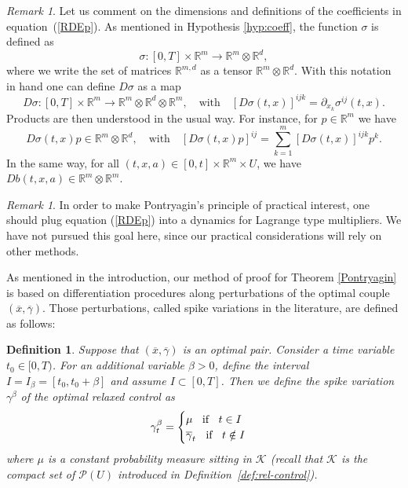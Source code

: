 \documentclass[12pt,reqno]{amsart}
\numberwithin{equation}{section}  %
\newcommand{\1}{{\bf 1}}
\newcommand{\2}{{\bf 2}}
\newcommand{\R}{\mathbb R}
\newcommand{\ck}{\mathcal K}
\newtheorem{definition}[theorem]{Definition}
\theoremstyle{remark}
\newtheorem{remark}[theorem]{Remark}
\theoremstyle{remark}
\begin{document}
        \begin{remark} Let us comment on the dimensions and definitions of the coefficients in equation~(\ref{RDEp}). As mentioned in Hypothesis \ref{hyp:coeff}, the function $\sigma$ is defined as 
        \[\sigma \colon [0,T]\times\R^{m}\longrightarrow \R^{m}\otimes\R^{d},\]
        where we write the set of matrices $\R^{m,d}$ as a tensor $\R^{m}\otimes \R^{d}$. With this notation in hand one can define $D\sigma$ as a map
        \[D\sigma\colon [0,T]\times \R^{m}\longrightarrow\R^m \otimes \R^{d}\otimes\R^m,
        \quad\text{with}\quad
        [D\sigma (t,x)]^{ijk}=\partial_{x_{k}}\sigma^{ij}(t,x).
        \]
Products are then understood in the usual way. For instance, for $p\in \R^{m}$ we have
        \begin{equation}
            D\sigma (t,x)p\in \R^{m}\otimes \R^{d},
        \quad\text{with}\quad
[D\sigma(t,x)p]^{ij}=\sum_{k=1}^{m}[D\sigma(t,x)]^{ijk}p^{k} .
        \end{equation}
In the same way, for all $(t,x,a)\in [0,t]\times \R^{m}\times U$, we have $Db(t,x,a)\in \R^{m}\otimes \R^{m}$.
            \end{remark}
        \begin{remark}
            In order to make Pontryagin's principle of practical interest, one should plug equation (\ref{RDEp}) into a dynamics for Lagrange type multipliers. We have not pursued this goal here, since our practical considerations will rely on other methods.
        \end{remark}
        As mentioned in the introduction, our method of proof for Theorem \ref{Pontryagin} is based on differentiation procedures along perturbations of the optimal couple $(\overline{x},\overline{\gamma})$. Those perturbations, called spike variations in the literature, are defined as follows:
        \begin{definition} \label{def:spike variation}
          Suppose that $(\overline{x},\overline{\gamma})$ is an optimal pair. Consider a time variable $t_{0}\in[0,T)$. For an additional variable $\beta>0$, define the interval $I=I_{\beta}=[t_{0},t_{0}+\beta]$ and assume $I\subset [0,T]$. Then we define the spike variation $\gamma^{\beta}$ of the optimal relaxed control as
          \begin{equation}\label{spike}\gamma^{\beta}_{t}=\begin{cases} \mu \hspace{0.2cm} \text{ if } \hspace{0.2cm} t\in I\\
			    \overline{\gamma}_{t} \hspace{0.2cm} \text{ if } \hspace{0.2cm} t\notin I
			\end{cases}\end{equation}
            where $\mu$ is a constant probability measure sitting in $\ck$ (recall that $\ck$ is the compact set of $\mathcal{P}(U)$ introduced in Definition~\ref{def:rel-control}).
           \end{definition}
\end{document}
